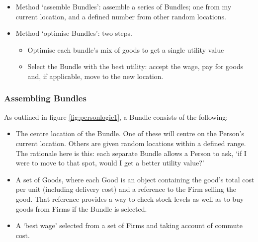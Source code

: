 \begin{itemize}
	\item Method `assemble Bundles': assemble a series of Bundles; one from my current location, and a defined number from other random locations.
\item Method `optimise Bundles': two steps. 
\begin{itemize}
	\item Optimise each bundle's mix of goods to get a single utility value
	\item Select the Bundle with the best utility: accept the wage, pay for goods and, if applicable, move to the new location.
\end{itemize}
\end{itemize}


\subsubsection{Assembling Bundles}

As outlined in figure \ref{fig:personlogic1}, a Bundle consists of the following: 

\begin{itemize}
	\item The centre location of the Bundle. One of these will centre on the Person's current location. Others are given random locations within a defined range. The rationale here is this: each separate Bundle allows a Person to ask, `if I were to move to that spot, would I get a better utility value?'
	\item A set of Goods, where each Good is an object containing the good's total cost per unit (including delivery cost) and a reference to the Firm selling the good. That reference provides a way to check stock levels as well as to buy goods from Firms if the Bundle is selected.
	\item A `best wage' selected from a set of Firms and taking account of commute cost.
\end{itemize}

